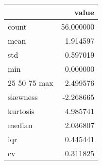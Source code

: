 \begin{tabular}{lr}
\toprule
 & value \\
\midrule
count & 56.000000 \\
mean & 1.914597 \\
std & 0.597019 \\
min & 0.000000 \\
25%
50%
75%
max & 2.499576 \\
skewness & -2.268665 \\
kurtosis & 4.985741 \\
median & 2.036807 \\
iqr & 0.445441 \\
cv & 0.311825 \\
\bottomrule
\end{tabular}
